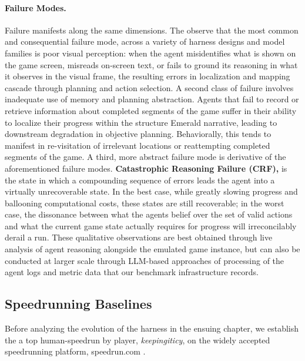 \paragraph{Failure Modes.} Failure manifests along the same dimensions. The observe that the most common and consequential failure mode, across a variety of harness designs and model families is poor visual perception: when the agent misidentifies what is shown on the game screen, misreads on-screen text, or fails to ground its reasoning in what it observes in the visual frame, the resulting errors in localization and mapping cascade through planning and action selection. A second class of failure involves inadequate use of memory and planning abstraction. Agents that fail to record or retrieve information about completed segments of the game suffer in their ability to localize their progress within the structure \pokemon{} Emerald narrative, leading to downstream degradation in objective planning. Behaviorally, this tends to manifest in re-visitation of irrelevant locations or reattempting completed segments of the game. A third, more abstract failure mode is derivative of the aforementioned failure modes. \textbf{Catastrophic Reasoning Failure (CRF),}  is the state in which a compounding sequence of errors leads the agent into a virtually unrecoverable state. In the best case, while greatly slowing progress and ballooning computational costs, these states are still recoverable; in the worst case, the dissonance between what the agents belief over the set of valid actions and what the current game state actually requires for progress will irreconcilably derail a run. These qualitative observations are best obtained through live analysis of agent reasoning alongside the emulated game instance, but can also be conducted at larger scale through LLM-based approaches of processing of the agent logs and metric data that our benchmark infrastructure records.

\subsection{Speedrunning Baselines}\label{sec:baselines}
Before analyzing the evolution of the \pokeagent{} harness in the ensuing chapter, we establish the a top human-speedrun by player, \textit{keepingiticy}, on the widely accepted speedrunning platform, speedrun.com .

